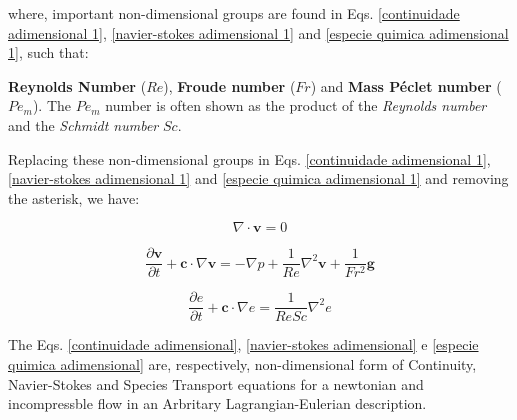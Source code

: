 \noindent
where, important non-dimensional groups are found in
Eqs. \ref{continuidade adimensional 1}, \ref{navier-stokes adimensional 1}
and \ref{especie quimica adimensional 1}, such that:
\item \textbf{Reynolds Number} ($Re$),
\textbf{Froude number} ($Fr$) and
\textbf{Mass Péclet number} ($Pe_{m}$).
The $Pe_{m}$ number is often
 shown as the product of
 the \textit{Reynolds number} and the \textit{Schmidt number} $Sc$.

\medskip
Replacing these non-dimensional groups in Eqs.
\ref{continuidade adimensional 1}, \ref{navier-stokes adimensional 1}
and \ref{especie quimica adimensional 1} and
removing the asterisk, we have:

\begin{equation} \label{continuidade adimensional}
 \nabla \cdot \textbf{v} = 0
\end{equation}

\begin{equation} \label{navier-stokes adimensional}
 \frac{\partial \textbf{v}}{\partial t} 
 + 
 \textbf{c} \cdot \nabla \textbf{v}
 =
 -
 \nabla p
 +
 \frac{1}{Re} \nabla^{2} \textbf{v}
 +
 \frac{1}{Fr^{2}} \textbf{g}
\end{equation}

\begin{equation} \label{especie quimica adimensional}
 \frac{\partial e}{\partial t}
 +
 \textbf{c} \cdot \nabla e
 =
 \frac{1}{ReSc} \nabla^{2} e
\end{equation}

\medskip
The Eqs.
\ref{continuidade adimensional}, 
\ref{navier-stokes adimensional} e 
\ref{especie quimica adimensional}
are, respectively, non-dimensional form of Continuity,
Navier-Stokes and Species Transport equations
for a newtonian and incompressble flow in an
Arbritary Lagrangian-Eulerian description.

